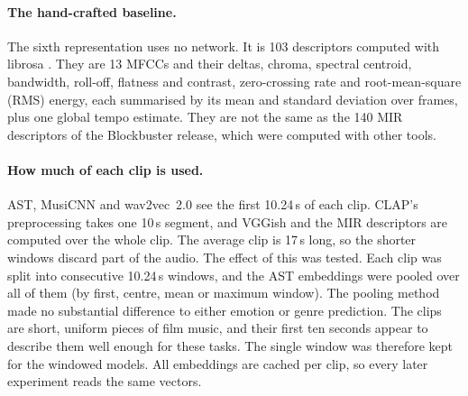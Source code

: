 \paragraph{The hand-crafted baseline.} The sixth representation uses no network. It is 103 descriptors computed with librosa \citep{mcfee2015librosa}. They are 13 MFCCs and their deltas, chroma, spectral centroid, bandwidth, roll-off, flatness and contrast, zero-crossing rate and root-mean-square (RMS) energy, each summarised by its mean and standard deviation over frames, plus one global tempo estimate. They are not the same as the 140 MIR descriptors of the Blockbuster release, which were computed with other tools.

\paragraph{How much of each clip is used.} AST, MusiCNN and wav2vec~2.0 see the first 10.24\,s of each clip. CLAP's preprocessing takes one 10\,s segment, and VGGish and the MIR descriptors are computed over the whole clip. The average clip is 17\,s long, so the shorter windows discard part of the audio. The effect of this was tested. Each clip was split into consecutive 10.24\,s windows, and the AST embeddings were pooled over all of them (by first, centre, mean or maximum window). The pooling method made no substantial difference to either emotion or genre prediction. The clips are short, uniform pieces of film music, and their first ten seconds appear to describe them well enough for these tasks. The single window was therefore kept for the windowed models. All embeddings are cached per clip, so every later experiment reads the same vectors.

